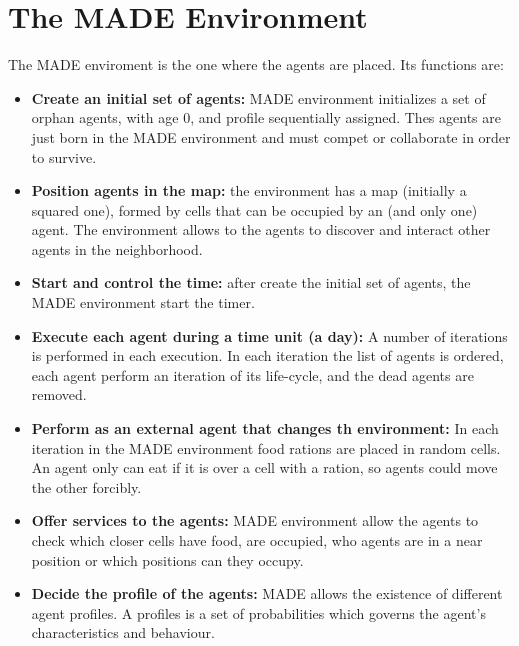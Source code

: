 \documentclass[runningheads]{llncs}
\begin{document}


\section{The MADE Environment}
\label{sec:made}

The MADE enviroment is the one where the agents are placed. Its functions are:

\begin{itemize}
\item \textbf{Create an initial set of agents:} MADE environment initializes a set of orphan agents, with age 0, and profile sequentially assigned. Thes agents are just born in the MADE environment and must compet or collaborate in order to survive.
\item \textbf{Position agents in the map:} the environment has a map (initially a squared one), formed by cells that can be occupied by an (and only one) agent. The environment allows to the agents to discover and interact other agents in the neighborhood.
\item \textbf{Start and control the time:} after create the initial set of agents, the MADE environment start the timer.
\item \textbf{Execute each agent during a time unit (a day):} A number of iterations is performed in each execution. In each iteration the list of agents is ordered, each agent perform an iteration of its life-cycle, and the dead agents are removed.
\item \textbf{Perform as an external agent that changes th environment:} In each iteration in the MADE environment food rations are placed in random cells. An agent only can eat if it is over a cell with a ration, so agents could move the other forcibly.
\item \textbf{Offer services to the agents:} MADE environment allow the agents to check which closer cells have food, are occupied, who agents are in a near position or which positions can they occupy.
\item \textbf{Decide the profile of the agents:} MADE allows the existence of different agent profiles. A profiles is a set of probabilities which governs the agent's characteristics and behaviour.
\end{itemize}
\end{document}
